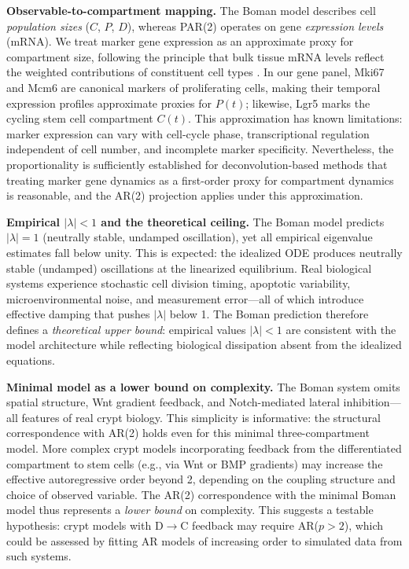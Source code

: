 \documentclass[11pt,letterpaper]{article}
\begin{document}
\textbf{Observable-to-compartment mapping.} The Boman model describes cell \textit{population sizes} ($C$, $P$, $D$), whereas PAR(2) operates on gene \textit{expression levels} (mRNA). We treat marker gene expression as an approximate proxy for compartment size, following the principle that bulk tissue mRNA levels reflect the weighted contributions of constituent cell types \citep{newman2015, avila2018}. In our gene panel, Mki67 and Mcm6 are canonical markers of proliferating cells, making their temporal expression profiles approximate proxies for $P(t)$; likewise, Lgr5 marks the cycling stem cell compartment $C(t)$. This approximation has known limitations: marker expression can vary with cell-cycle phase, transcriptional regulation independent of cell number, and incomplete marker specificity. Nevertheless, the proportionality is sufficiently established for deconvolution-based methods \citep{newman2015} that treating marker gene dynamics as a first-order proxy for compartment dynamics is reasonable, and the AR(2) projection applies under this approximation.

\textbf{Empirical $|\lambda| < 1$ and the theoretical ceiling.} The Boman model predicts $|\lambda| = 1$ (neutrally stable, undamped oscillation), yet all empirical eigenvalue estimates fall below unity. This is expected: the idealized ODE produces neutrally stable (undamped) oscillations at the linearized equilibrium. Real biological systems experience stochastic cell division timing, apoptotic variability, microenvironmental noise, and measurement error---all of which introduce effective damping that pushes $|\lambda|$ below 1. The Boman prediction therefore defines a \textit{theoretical upper bound}: empirical values $|\lambda| < 1$ are consistent with the model architecture while reflecting biological dissipation absent from the idealized equations.

\textbf{Minimal model as a lower bound on complexity.} The Boman system omits spatial structure, Wnt gradient feedback, and Notch-mediated lateral inhibition---all features of real crypt biology. This simplicity is informative: the structural correspondence with AR(2) holds even for this minimal three-compartment model. More complex crypt models incorporating feedback from the differentiated compartment to stem cells (e.g., via Wnt or BMP gradients) may increase the effective autoregressive order beyond 2, depending on the coupling structure and choice of observed variable. The AR(2) correspondence with the minimal Boman model thus represents a \textit{lower bound} on complexity. This suggests a testable hypothesis: crypt models with D$\rightarrow$C feedback may require AR($p > 2$), which could be assessed by fitting AR models of increasing order to simulated data from such systems.
\end{document}
